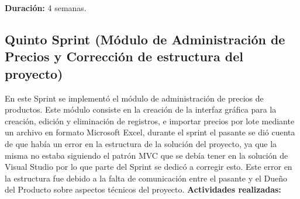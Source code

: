 \textbf{Duración:} 4 semanas.


\subsection{Quinto Sprint (Módulo de Administración de Precios y Corrección de estructura del proyecto)}
En este Sprint se implementó el módulo de administración de precios de productos. Este módulo consiste en la creación de la interfaz gráfica para la creación, edición y eliminación de registros, e importar precios por lote mediante un archivo en formato Microsoft Excel, durante el sprint el pasante se dió cuenta de que había un error en la estructura de la solución del proyecto, ya que la misma no estaba siguiendo el patrón MVC que se debía tener en la solución de Visual Studio por lo que parte del Sprint se dedicó a corregir esto. Este error en la estructura fue debido a la falta de comunicación entre el pasante y el Dueño del Producto sobre aspectos técnicos del proyecto.
\vskip 0.5cm
\textbf{Actividades realizadas:}

